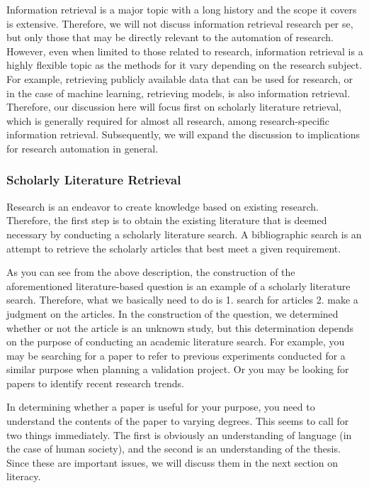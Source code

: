Information retrieval is a major topic with a long history and the scope it covers is extensive. Therefore, we will not discuss information retrieval research per se, but only those that may be directly relevant to the automation of research. However, even when limited to those related to research, information retrieval is a highly flexible topic as the methods for it vary depending on the research subject. For example, retrieving publicly available data that can be used for research, or in the case of machine learning, retrieving models, is also information retrieval. Therefore, our discussion here will focus first on scholarly literature retrieval, which is generally required for almost all research, among research-specific information retrieval. Subsequently, we will expand the discussion to implications for research automation in general.

\subsubsection{Scholarly Literature Retrieval}
Research is an endeavor to create knowledge based on existing research. Therefore, the first step is to obtain the existing literature that is deemed necessary by conducting a scholarly literature search. A bibliographic search is an attempt to retrieve the scholarly articles that best meet a given requirement.

As you can see from the above description, the construction of the aforementioned literature-based question is an example of a scholarly literature search. Therefore, what we basically need to do is 1. search for articles 2. make a judgment on the articles. In the construction of the question, we determined whether or not the article is an unknown study, but this determination depends on the purpose of conducting an academic literature search. For example, you may be searching for a paper to refer to previous experiments conducted for a similar purpose when planning a validation project. Or you may be looking for papers to identify recent research trends.

In determining whether a paper is useful for your purpose, you need to understand the contents of the paper to varying degrees. This seems to call for two things immediately. The first is obviously an understanding of language (in the case of human society), and the second is an understanding of the thesis. Since these are important issues, we will discuss them in the next section on literacy.

